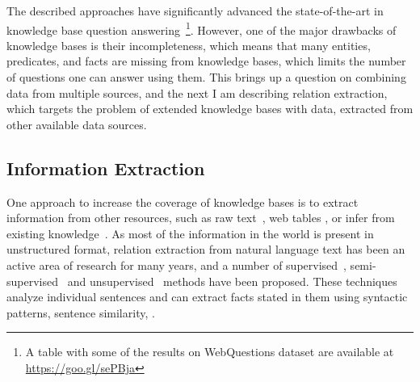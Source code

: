 The described approaches have significantly advanced the state-of-the-art in knowledge base question answering~\footnote{A table with some of the results on WebQuestions dataset are available at \href{url}{https://goo.gl/sePBja}}.
However, one of the major drawbacks of knowledge bases is their incompleteness, which means that many entities, predicates, and facts are missing from knowledge bases, which limits the number of questions one can answer using them.
This brings up a question on combining data from multiple sources, and the next I am describing relation extraction, which targets the problem of extended knowledge bases with data, extracted from other available data sources.

\subsection{Information Extraction}
\label{section:relatedwork:factoid:relextract}


One approach to increase the coverage of knowledge bases is to extract information from other resources, such as raw text~\cite{Gupta:2014:BOS:2732286.2732288,jijkoun2004information,MintzBSJ09}, web tables \cite{Cafarella:2008:WEP:1453856.1453916}, or infer from existing knowledge~\cite{bordes2011learning,gardner2015efficient,lao2012reading}.
As most of the information in the world is present in unstructured format, relation extraction from natural language text has been an active area of research for many years, and a number of supervised~\cite{snow2004learning}, semi-supervised~\cite{Agichtein:2000:SER:336597.336644} and unsupervised~\cite{Fader:2011:IRO:2145432.2145596} methods have been proposed.
These techniques analyze individual sentences and can extract facts stated in them using syntactic patterns, sentence similarity, \etc.

